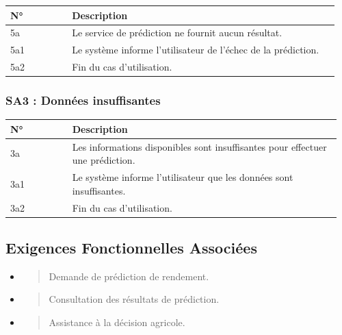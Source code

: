 \begin{longtable}{@{}p{0.18\linewidth}p{0.78\linewidth}@{}}
\toprule
\rowcolors{2}{gray!10}{white}
\textbf{N°} & \textbf{Description} \\
\midrule
\endhead
5a & Le service de prédiction ne fournit aucun résultat. \\
5a1 & Le système informe l'utilisateur de l'échec de la prédiction. \\
5a2 & Fin du cas d'utilisation. \\
\bottomrule
\end{longtable}

\hypertarget{sa3-donnuxe9es-insuffisantes}{%
\subsubsection{SA3 : Données
insuffisantes}\label{sa3-donnuxe9es-insuffisantes}}

\begin{longtable}{@{}p{0.18\linewidth}p{0.78\linewidth}@{}}
\toprule
\rowcolors{2}{gray!10}{white}
\textbf{N°} & \textbf{Description} \\
\midrule
\endhead
3a & Les informations disponibles sont insuffisantes pour effectuer une
prédiction. \\
3a1 & Le système informe l'utilisateur que les données sont
insuffisantes. \\
3a2 & Fin du cas d'utilisation. \\
\bottomrule
\end{longtable}

\hypertarget{exigences-fonctionnelles-associuxe9es-3}{%
\subsection{Exigences Fonctionnelles
Associées}\label{exigences-fonctionnelles-associuxe9es-3}}

\begin{itemize}
\item
  \begin{quote}
  Demande de prédiction de rendement.
  \end{quote}
\item
  \begin{quote}
  Consultation des résultats de prédiction.
  \end{quote}
\item
  \begin{quote}
  Assistance à la décision agricole.
  \end{quote}
\end{itemize}

